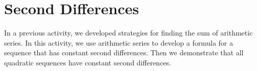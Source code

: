 \newpage
\section{Second Differences}\label{A:secondDifferences}
In a previous activity, we developed strategies for finding the sum of arithmetic series.  In this activity, we use arithmetic series to develop a formula for a sequence that has constant second differences.  Then we demonstrate that all quadratic sequences have constant second differences.  


%
%
